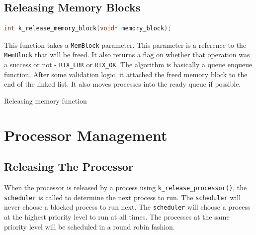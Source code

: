 \documentclass[12pt]{report}
\begin{document}
\subsection{Releasing Memory Blocks}

\begin{minipage}{\textwidth}
\begin{lstlisting}[language=C, frame=single]
int k_release_memory_block(void* memory_block);
\end{lstlisting}
\end{minipage}

This function takes a \texttt{MemBlock} parameter. This parameter is a reference to the \texttt{MemBlock} that will be freed. It also returns a flag on whether that operation was a success or not - \texttt{RTX_ERR} or \texttt{RTX_OK}. The algorithm is basically a queue enqueue function. After some validation logic, it attached the freed memory block to the end of the linked list. It also moves processes into the ready queue if possible.

\begin{algorithm}[H]
  \caption{Releasing memory function}
  \begin{algorithmic}[1]
	  \EndIf
	  \EndIf
	  \EndIf
	  \EndIf
    \EndProcedure
  \end{algorithmic}
\end{algorithm}

\pagebreak



\section{Processor Management}

\subsection{Releasing The Processor}
When the processor is released by a process using \texttt{k_release_processor()}, the \texttt{scheduler} is called to determine the next process to run. The \texttt{scheduler} will never choose a blocked process to run next.  The \texttt{scheduler} will choose a process at the highest priority level to run at all times.  The processes at the same priority level will be scheduled in a round robin fashion.
\end{document}
